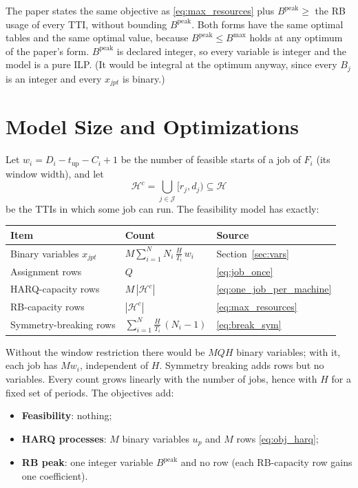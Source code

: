 \documentclass[11pt]{article}
\begin{document}
The paper states the same objective as \eqref{eq:max_resources} plus
$B^{\mathrm{peak}} \ge$ the RB usage of every TTI, without bounding
$B^{\mathrm{peak}}$. Both forms have the same optimal tables and the same
optimal value, because $B^{\mathrm{peak}} \le B^{\max}$ holds at any optimum
of the paper's form. $B^{\mathrm{peak}}$ is declared integer, so every
variable is integer and the model is a pure ILP. (It would be integral at the
optimum anyway, since every $B_j$ is an integer and every $x_{jpt}$ is
binary.)


\section{Model Size and Optimizations}\label{sec:size}

Let $w_i = D_i - t_\mathrm{up} - C_i + 1$ be the number of feasible starts of
a job of $F_i$ (its window width), and let
\[
\mathcal{H}^{c} = \bigcup_{j\in\mathcal J} [r_j, d_j) \subseteq \mathcal{H}
\]
be the TTIs in which some job can run. The feasibility model has exactly:

\begin{center}
\begin{tabular}{lll}
\toprule
\textbf{Item} & \textbf{Count} & \textbf{Source} \\
\midrule
Binary variables $x_{jpt}$ & $M \sum_{i=1}^{N} N_i \, \frac{H}{T_i} \, w_i$ & Section~\ref{sec:vars} \\
Assignment rows & $Q$ & \eqref{eq:job_once} \\
HARQ-capacity rows & $M \, |\mathcal{H}^{c}|$ & \eqref{eq:one_job_per_machine} \\
RB-capacity rows & $|\mathcal{H}^{c}|$ & \eqref{eq:max_resources} \\
Symmetry-breaking rows & $\sum_{i=1}^{N} \frac{H}{T_i} \, (N_i - 1)$ & \eqref{eq:break_sym} \\
\bottomrule
\end{tabular}
\end{center}

Without the window restriction there would be $M Q H$ binary variables; with
it, each job has $M w_i$, independent of $H$. Symmetry breaking adds rows but
no variables. Every count grows linearly with the number of jobs, hence with
$H$ for a fixed set of periods. The objectives add:

\begin{itemize}
    \item \textbf{Feasibility}: nothing;
    \item \textbf{HARQ processes}: $M$ binary variables $u_p$ and $M$ rows
          \eqref{eq:obj_harq};
    \item \textbf{RB peak}: one integer variable $B^{\mathrm{peak}}$ and no
          row (each RB-capacity row gains one coefficient).
\end{itemize}
\end{document}

